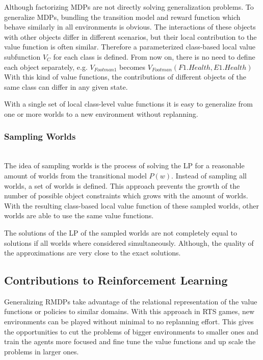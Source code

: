 Although factorizing MDPs are not directly solving generalization problems. To generalize MDPs, bundling the transition model and reward function which behave similarly in all environments is obvious. The interactions of these objects with other objects differ in different scenarios, but their local contribution to the value function is often similar. Therefore a parameterized class-based local value subfunction $V_C$ for each class is defined. From now on, there is no need to define each object separately, e.g. $V_{Footman1}$ becomes $V_{Footman}(F1.Health, E1.Health)$ 
With this kind of value functions, the contributions of different objects of the same class can differ in any given state.

With a single set of local class-level value functions it is easy to generalize from one or more worlds to a new environment without replanning.

\subsubsection{Sampling Worlds} ~\\

The idea of sampling worlds is the process of solving the LP for a reasonable amount of worlds from the transitional model $P(w)$. Instead of sampling all worlds, a set of worlds is defined. This approach prevents the growth of the number of possible object constraints which grows with the amount of worlds.
With the resulting class-based local value function of these sampled worlds, other worlds are able to use the same value functions.

The solutions of the LP of the sampled worlds are not completely equal to solutions if all worlds where considered simultaneously. Although, the quality of the approximations are very close to the exact solutions.

\subsection{Contributions to Reinforcement Learning}

Generalizing RMDPs take advantage of the relational representation of the value functions or policies to similar domains.
With this approach in RTS games, new environments can be played without minimal to no replanning effort. This gives the opportunities to cut the problems of bigger environments to smaller ones and train the agents more focused and fine tune the value functions and up scale the problems in larger ones.

